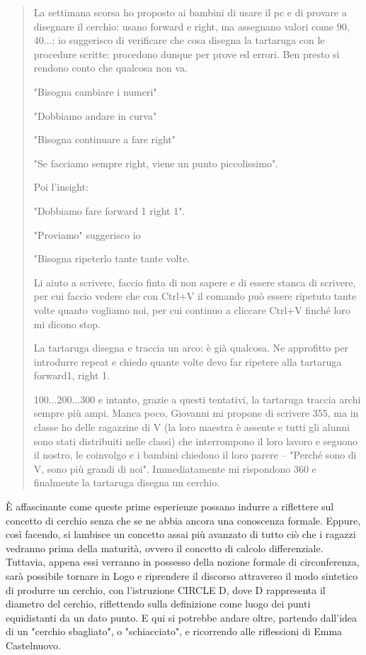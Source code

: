 \begin{quote}
La settimana scorsa ho proposto ai bambini di usare il pc e di provare a disegnare il cerchio: usano forward e right, ma assegnano valori come 90, 40...; io suggerisco  di verificare che cosa disegna la tartaruga con le procedure scritte: procedono dunque per prove ed errori. Ben presto si rendono conto che qualcosa non va.

"Bisogna cambiare i numeri"

"Dobbiamo andare in curva"

"Bisogna continuare a fare right"

"Se facciamo sempre right, viene un punto piccolissimo".

Poi l'insight:

"Dobbiamo fare forward 1 right 1".

"Proviamo" suggerisco io

"Bisogna ripeterlo tante tante volte.

Li aiuto a scrivere, faccio finta di non sapere e di essere stanca di scrivere, per cui faccio vedere che con Ctrl+V il comando può essere ripetuto tante volte quanto vogliamo noi, per cui continuo a cliccare Ctrl+V finché loro mi dicono stop.

La tartaruga disegna e traccia un arco: è già qualcosa. Ne approfitto per introdurre repeat e chiedo quante volte devo far ripetere alla tartaruga forward1, right 1.

100...200...300 e intanto, grazie a questi tentativi, la tartaruga traccia archi sempre più ampi. Manca poco, Giovanni mi propone di scrivere 355, ma in classe ho delle ragazzine di V (la loro maestra è assente e tutti gli alunni sono stati distribuiti nelle classi) che interrompono il loro lavoro e seguono il nostro, le coinvolgo e i bambini chiedono il loro parere –  "Perché sono di V, sono più grandi di noi". Immediatamente mi rispondono 360 e finalmente la tartaruga disegna un cerchio.

\end{quote}

È affascinante come queste prime esperienze possano indurre a riflettere sul concetto di cerchio senza che se ne abbia ancora una conoscenza formale. Eppure, così facendo, si lambisce un concetto assai più avanzato di tutto ciò che i ragazzi vedranno prima della maturità, ovvero il concetto di calcolo differenziale. Tuttavia, appena essi verranno in possesso della nozione formale di circonferenza, sarà possibile tornare in Logo e riprendere il discorso attraverso il modo sintetico di produrre un cerchio, con l'istruzione CIRCLE D, dove D rappresenta il diametro del cerchio, riflettendo sulla definizione come luogo dei punti equidistanti da un dato punto. E qui si potrebbe andare oltre, partendo dall'idea di un "cerchio sbagliato", o "schiacciato", e ricorrendo alle riflessioni di Emma Castelnuovo\cite{Castelnuovo}.

